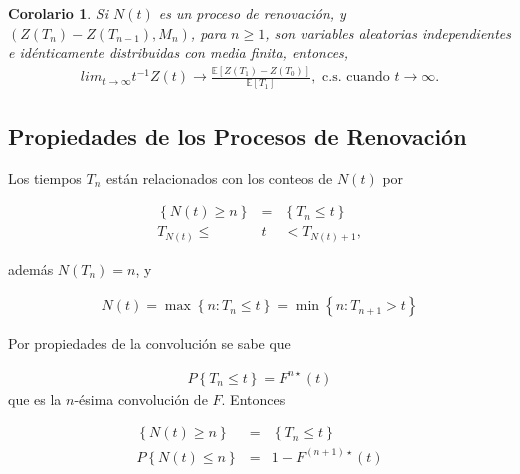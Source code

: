 \documentclass{article}
\newtheorem{Coro}{Corolario}
\newcommand{\esp}{\mathbb{E}}
\begin{document}
\begin{Coro}
Si $N\left(t\right)$ es un proceso de renovaci\'on, y $\left(Z\left(T_{n}\right)-Z\left(T_{n-1}\right),M_{n}\right)$, para $n\geq1$, son variables aleatorias independientes e id\'enticamente distribuidas con media finita, entonces,
\begin{eqnarray}
lim_{t\rightarrow\infty}t^{-1}Z\left(t\right)\rightarrow\frac{\esp\left[Z\left(T_{1}\right)-Z\left(T_{0}\right)\right]}{\esp\left[T_{1}\right]},\textrm{ c.s. cuando  }t\rightarrow\infty.
\end{eqnarray}
\end{Coro}



%
\subsection{Propiedades de los Procesos de Renovaci\'on}
%

Los tiempos $T_{n}$ est\'an relacionados con los conteos de $N\left(t\right)$ por

\begin{eqnarray*}
\left\{N\left(t\right)\geq n\right\}&=&\left\{T_{n}\leq t\right\}\\
T_{N\left(t\right)}\leq &t&<T_{N\left(t\right)+1},
\end{eqnarray*}

adem\'as $N\left(T_{n}\right)=n$, y 

\begin{eqnarray*}
N\left(t\right)=\max\left\{n:T_{n}\leq t\right\}=\min\left\{n:T_{n+1}>t\right\}
\end{eqnarray*}

Por propiedades de la convoluci\'on se sabe que

\begin{eqnarray*}
P\left\{T_{n}\leq t\right\}=F^{n\star}\left(t\right)
\end{eqnarray*}
que es la $n$-\'esima convoluci\'on de $F$. Entonces 

\begin{eqnarray*}
\left\{N\left(t\right)\geq n\right\}&=&\left\{T_{n}\leq t\right\}\\
P\left\{N\left(t\right)\leq n\right\}&=&1-F^{\left(n+1\right)\star}\left(t\right)
\end{eqnarray*}
\end{document}
